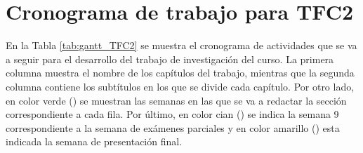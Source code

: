 \section*{Cronograma de trabajo para TFC2}

En la Tabla \ref{tab:gantt_TFC2} se muestra el cronograma de actividades que se va a seguir para el desarrollo del trabajo de investigación del curso. La primera columna muestra el nombre de los capítulos del trabajo, mientras que la segunda columna contiene los subtítulos en los que se divide cada capítulo. Por otro lado, en color verde () se muestran las semanas en las que se va a redactar la sección correspondiente a cada fila. Por último, en color cian () se indica la semana 9 correspondiente a la semana de exámenes parciales y en color amarillo () esta indicada la semana de presentación final. 


